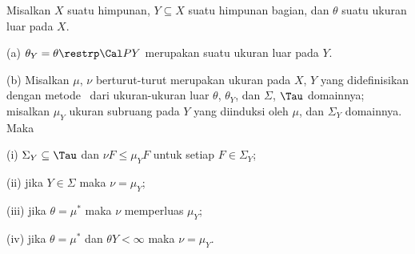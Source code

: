  Misalkan $X$ suatu himpunan, $Y\subseteq X$ suatu
himpunan bagian, dan $\theta$ suatu ukuran luar pada $X$.

(a) $\theta_Y=\theta\restrp\Cal PY$ merupakan suatu ukuran luar pada $Y$.

(b) Misalkan $\mu$, $\nu$ berturut-turut merupakan ukuran pada $X$, $Y$
yang didefinisikan dengan metode \Caratheodory\ dari ukuran-ukuran luar
$\theta$, $\theta_Y$, dan $\Sigma$, $\Tau$ domainnya; misalkan $\mu_Y$
ukuran subruang pada $Y$ yang diinduksi oleh $\mu$, dan $\Sigma_Y$
domainnya.   Maka

\quad (i) $\Sigma_Y\subseteq\Tau$ dan $\nu F\le\mu_YF$ untuk setiap
$F\in\Sigma_Y$;

\quad(ii) jika $Y\in\Sigma$ maka $\nu=\mu_Y$;

\quad(iii) jika $\theta=\mu^*$ maka $\nu$ memperluas $\mu_Y$;

\quad(iv) jika $\theta=\mu^*$ dan $\theta Y<\infty$ maka $\nu=\mu_Y$.

